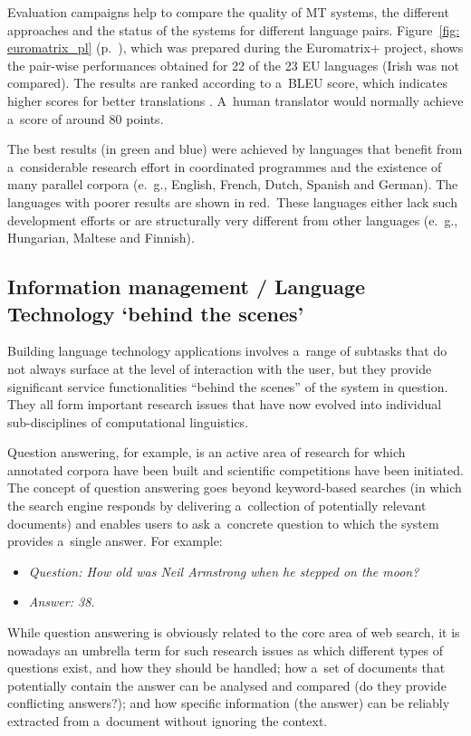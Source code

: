 \begin{multicols}{2}
Evaluation campaigns help to compare the quality of MT systems, the
different approaches and the status of the systems for different
language pairs. Figure~\ref{fig: euromatrix_pl} (p.~\pageref{fig:
euromatrix_pl}), which was prepared during the Euromatrix+ project,
shows the pair-wise performances obtained for 22 of the 23 EU
languages (Irish was not compared). The results are ranked according
to a~BLEU score, which indicates higher scores for better translations
\cite{bleu1}. A~human translator would normally achieve a~score of
around 80 points. 

The best results (in green and blue) were achieved by languages that
benefit from a~considerable research effort in coordinated programmes
and the existence of many parallel corpora (e.\, g., English, French,
Dutch, Spanish and German). The languages with poorer results are
shown in red.~These languages either lack such development efforts or
are structurally very different from other languages (e.\, g.,
Hungarian, Maltese and Finnish). 

\subsection{Information management / Language Technology ‘behind the
scenes’} 

Building language technology applications involves a~range of subtasks
that do not always surface at the level of interaction with the user,
but they provide significant service functionalities “behind the
scenes” of the system in question. They all form important research
issues that have now evolved into individual sub-disciplines of
computational linguistics. 

Question answering, for example, is an active area of research for
which annotated corpora have been built and scientific competitions
have been initiated. The concept of question answering goes beyond
keyword-based searches (in which the search engine responds by
delivering a~collection of potentially relevant documents) and enables
users to ask a~concrete question to which the system provides a~single
answer. For example: 

\begin{itemize} \item[] \textit{Question: How old was Neil Armstrong
when he stepped on the moon?} \item[] \textit{Answer: 38.}
\end{itemize} 

While question answering is obviously related to the core area of web
search, it is nowadays an umbrella term for such research issues as
which different types of questions exist, and how they should be
handled; how a~set of documents that potentially contain the answer
can be analysed and compared (do they provide conflicting answers?);
and how specific information (the answer) can be reliably extracted
from a~document without ignoring the context. 


\end{multicols}
